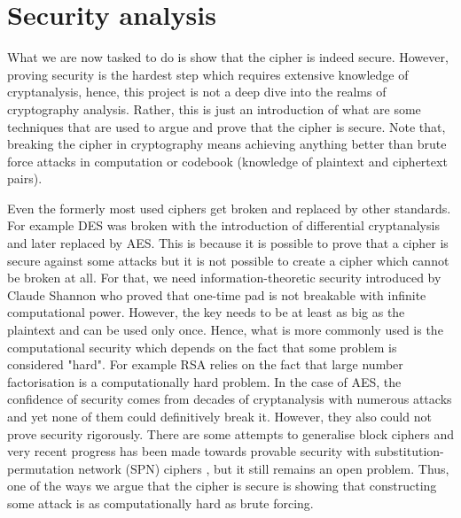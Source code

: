 \documentclass{Resources/UoBLab1}
\theoremstyle{definition}
\begin{document}
\section{Security analysis}\label{chapter:security}
What we are now tasked to do is show that the cipher is indeed secure. However, proving security is the hardest step which requires extensive knowledge of cryptanalysis, hence, this project is not a deep dive into the realms of cryptography analysis. Rather, this is just an introduction of what are some techniques that are used to argue and prove that the cipher is secure. Note that, breaking the cipher in cryptography means achieving anything better than brute force attacks in computation or codebook (knowledge of plaintext and ciphertext pairs).

Even the formerly most used ciphers get broken and replaced by other standards. For example DES was broken with the introduction of differential cryptanalysis\cite{DESBreak} and later replaced by AES. This is because it is possible to prove that a cipher is secure against some attacks but it is not possible to create a cipher which cannot be broken at all. For that, we need information-theoretic security introduced by Claude Shannon who proved that one-time pad is not breakable with infinite computational power\cite{OneTime}. However, the key needs to be at least as big as the plaintext and can be used only once. Hence, what is more commonly used is the computational security which depends on the fact that some problem is considered "hard". For example RSA relies on the fact that large number factorisation is a computationally hard problem. In the case of AES, the confidence of security comes from decades of cryptanalysis with numerous attacks and yet none of them could definitively break it. However, they also could not prove security rigorously. There are some attempts to generalise block ciphers \cite{GTDS} and very recent progress has been made towards provable security with substitution-permutation network (SPN) ciphers \cite{SPNProof}, but it still remains an open problem. Thus, one of the ways we argue that the cipher is secure is showing that constructing some attack is as computationally hard as brute forcing.
\end{document}
